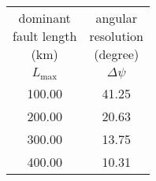 \begin{tabular}{cc}
\makecell{dominant \\fault length\\ (km)} & \makecell{angular \\ resolution \\ (degree)}\\
$L_{\text{max}}$ & $\Delta\psi$\\
100.00 & 41.25\\
200.00 & 20.63\\
300.00 & 13.75\\
400.00 & 10.31\\
\end{tabular}
